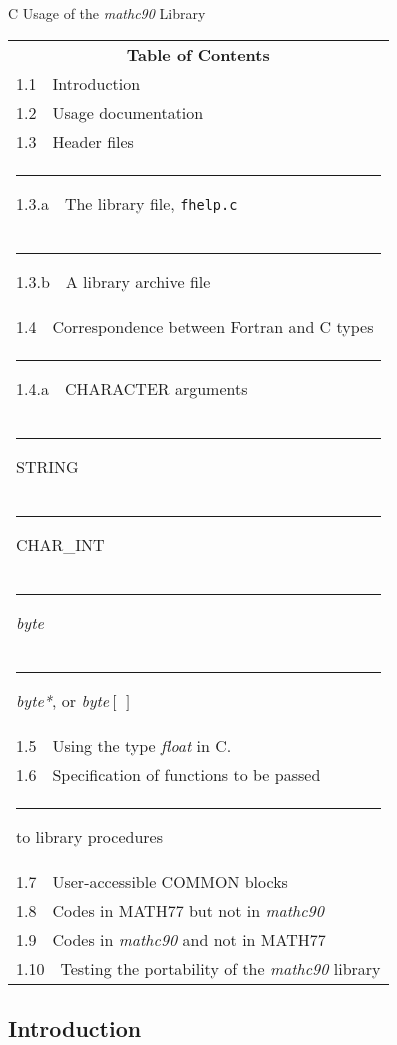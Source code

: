 \documentclass[twoside]{MATH77}
\begin{document}
\begappc C Usage of the {\em mathc90} Library


\begin{tabular*}{3.3in}{l}
\multicolumn{1}{c}{\bf Table of Contents\rule[-10pt]{0pt}{8pt}}\\
1.1\ \ Introduction \dotfill \pageref{Intro}\\
1.2\ \ Usage documentation \dotfill \pageref{Usage}\\
1.3\ \ Header files \dotfill \pageref{Headers}\\
\rule{20pt}{0pt}1.3.a\ \ The library file, {\tt fhelp.c} \dotfill \pageref{libfile}\\
\rule{20pt}{0pt}1.3.b\ \ A library archive file \dotfill \pageref{libarc}\\
\parbox{3.3in}
{1.4\ \ Correspondence between Fortran and C
types \dotfill \pageref{corr}}\\
\rule{20pt}{0pt}1.4.a\ \ CHARACTER arguments \dotfill \pageref{chararg}\\
\rule{60pt}{0pt}STRING \dotfill \pageref{string}\\
\rule{60pt}{0pt}CHAR\_INT \dotfill \pageref{char}\\
\rule{60pt}{0pt}{\em byte} \dotfill \pageref{byte}\\
\rule{60pt}{0pt}{\em byte*}, or {\em byte}{$[\,]$} \dotfill \pageref{bytestar}\\
1.5\ \ Using the type {\em float} in C. \dotfill \pageref{caution_float}\\
1.6\ \ Specification of functions to be passed\\
\rule{20pt}{0pt}to library procedures \dotfill \pageref{functions}\\
1.7\ \ User-accessible COMMON blocks \dotfill \pageref{common}\\
1.8\ \ Codes in MATH77 but not in {\em mathc90} \dotfill \pageref{MATH77_not_mathc90}\\
1.9\ \ Codes in {\em mathc90} and not in MATH77 \dotfill \pageref{mathc90_not_MATH77}\\
\parbox{3.3in}
{1.10\ \ Testing the portability of the {\em mathc90} library
\dotfill \pageref{testport}}
\end{tabular*}

\subsection{Introduction\label{Intro}}
\end{document}
